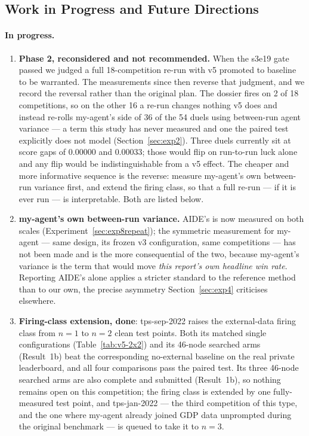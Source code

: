 \documentclass[11pt,a4paper]{article}
\begin{document}
\subsection{Work in Progress and Future Directions}
\label{sec:future}

\paragraph{In progress.}
\begin{enumerate}[leftmargin=*]
  \item \textbf{Phase 2, reconsidered and not recommended.} When the s3e19 gate passed we judged a full 18-competition re-run with v5 promoted to baseline to be warranted. The measurements since then reverse that judgment, and we record the reversal rather than the original plan. The dossier fires on 2 of 18 competitions, so on the other 16 a re-run changes nothing v5 does and instead re-rolls my-agent's side of 36 of the 54 duels using between-run agent variance --- a term this study has never measured and one the paired test explicitly does not model (Section~\ref{sec:exp2}). Three duels currently sit at score gaps of $0.00000$ and $0.00033$; those would flip on run-to-run luck alone and any flip would be indistinguishable from a v5 effect. The cheaper and more informative sequence is the reverse: measure my-agent's own between-run variance first, and extend the firing class, so that a full re-run --- if it is ever run --- is interpretable. Both are listed below.
  \item \textbf{my-agent's own between-run variance.} AIDE's is now measured on both scales (Experiment~\ref{sec:exp8repeat}); the symmetric measurement for my-agent --- same design, its frozen v3 configuration, same competitions --- has not been made and is the more consequential of the two, because my-agent's variance is the term that would move \emph{this report's own headline win rate}. Reporting AIDE's alone applies a stricter standard to the reference method than to our own, the precise asymmetry Section~\ref{sec:exp4} criticises elsewhere.
  \item \textbf{Firing-class extension, done}: tps-sep-2022 raises the external-data firing class from $n{=}1$ to $n{=}2$ clean test points. Both its matched single configurations (Table~\ref{tab:v5-2x2}) and its 46-node searched arms (Result~1b) beat the corresponding no-external baseline on the real private leaderboard, and all four comparisons pass the paired test. Its three 46-node searched arms are also complete and submitted (Result~1b), so nothing remains open on this competition; the firing class is extended by one fully-measured test point, and tps-jan-2022 --- the third competition of this type, and the one where my-agent already joined GDP data unprompted during the original benchmark --- is queued to take it to $n{=}3$.

\end{enumerate}
\end{document}
